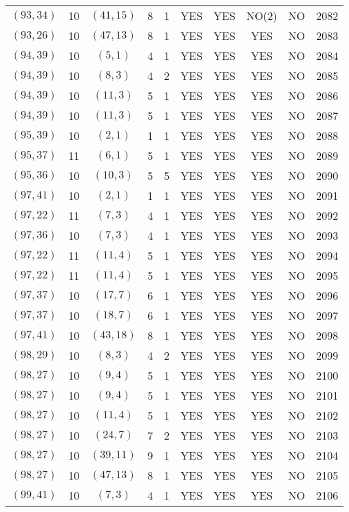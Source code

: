 \begin{longtable}{|c|c|c|c|c|c|c|c|c|c|}
$(93, 34)$ & 10 & $(41, 15)$ & 8 & 1 & YES & YES & NO(2) & NO & 2082\\
$(93, 26)$ & 10 & $(47, 13)$ & 8 & 1 & YES & YES & YES & NO & 2083\\
$(94, 39)$ & 10 & $(5, 1)$ & 4 & 1 & YES & YES & YES & NO & 2084\\
$(94, 39)$ & 10 & $(8, 3)$ & 4 & 2 & YES & YES & YES & NO & 2085\\
$(94, 39)$ & 10 & $(11, 3)$ & 5 & 1 & YES & YES & YES & NO & 2086\\
$(94, 39)$ & 10 & $(11, 3)$ & 5 & 1 & YES & YES & YES & NO & 2087\\
$(95, 39)$ & 10 & $(2, 1)$ & 1 & 1 & YES & YES & YES & NO & 2088\\
$(95, 37)$ & 11 & $(6, 1)$ & 5 & 1 & YES & YES & YES & NO & 2089\\
$(95, 36)$ & 10 & $(10, 3)$ & 5 & 5 & YES & YES & YES & NO & 2090\\
$(97, 41)$ & 10 & $(2, 1)$ & 1 & 1 & YES & YES & YES & NO & 2091\\
$(97, 22)$ & 11 & $(7, 3)$ & 4 & 1 & YES & YES & YES & NO & 2092\\
$(97, 36)$ & 10 & $(7, 3)$ & 4 & 1 & YES & YES & YES & NO & 2093\\
$(97, 22)$ & 11 & $(11, 4)$ & 5 & 1 & YES & YES & YES & NO & 2094\\
$(97, 22)$ & 11 & $(11, 4)$ & 5 & 1 & YES & YES & YES & NO & 2095\\
$(97, 37)$ & 10 & $(17, 7)$ & 6 & 1 & YES & YES & YES & NO & 2096\\
$(97, 37)$ & 10 & $(18, 7)$ & 6 & 1 & YES & YES & YES & NO & 2097\\
$(97, 41)$ & 10 & $(43, 18)$ & 8 & 1 & YES & YES & YES & NO & 2098\\
$(98, 29)$ & 10 & $(8, 3)$ & 4 & 2 & YES & YES & YES & NO & 2099\\
$(98, 27)$ & 10 & $(9, 4)$ & 5 & 1 & YES & YES & YES & NO & 2100\\
$(98, 27)$ & 10 & $(9, 4)$ & 5 & 1 & YES & YES & YES & NO & 2101\\
$(98, 27)$ & 10 & $(11, 4)$ & 5 & 1 & YES & YES & YES & NO & 2102\\
$(98, 27)$ & 10 & $(24, 7)$ & 7 & 2 & YES & YES & YES & NO & 2103\\
$(98, 27)$ & 10 & $(39, 11)$ & 9 & 1 & YES & YES & YES & NO & 2104\\
$(98, 27)$ & 10 & $(47, 13)$ & 8 & 1 & YES & YES & YES & NO & 2105\\
$(99, 41)$ & 10 & $(7, 3)$ & 4 & 1 & YES & YES & YES & NO & 2106\\

\end{longtable}
